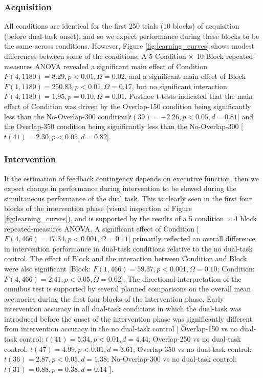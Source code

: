 \documentclass[apacite,draftfirst,jou]{apa6}
\begin{document}
\subsubsection*{Acquisition}
All conditions are identical for the first 250 trials (10 blocks) of acquisition
(before dual-task onset), and so we expect performance during these blocks to be
the same across conditions. However, Figure \ref{fig:learning_curves} shows
modest differences between some of the conditions. A 5 Condition $\times$ 10
Block repeated-measures ANOVA revealed a significant main effect of Condition
$F(4,1180) = 8.29, p < 0.01, \Omega = 0.02$, and a significant main effect of
Block $F(1,1180) = 250.83, p < 0.01, \Omega = 0.17$, but no significant
interaction $F(4,1180) = 1.95, p = 0.10, \Omega = 0.01$. Posthoc t-tests
indicated that the main effect of Condition was driven by the Overlap-150
condition being significantly less than the No-Overlap-300 condition[$t(39) =
-2.26, p < 0.05, d = 0.81$] and the Overlap-350 condition being significantly
less than the No-Overlap-300 [$t(41) = 2.30, p < 0.05, d = 0.82$].

\subsubsection*{Intervention}
If the estimation of feedback contingency depends on executive function,
then we expect change in performance during intervention to be slowed during the
simultaneous performance of the dual task. This is clearly seen in the first
four blocks of the intervention phase (visual inspection of Figure
\ref{fig:learning_curves}), and is supported by the results of a 5 condition
$\times$ 4 block repeated-measures ANOVA. A significant effect of Condition
[$F(4,466) = 17.34, p < 0.001, \Omega = 0.11$] primarily reflected an overall
difference in intervention performance in dual-task conditions relative to the
no dual-task control. The effect of Block and the interaction between Condition
and Block were also significant [Block: $F(1,466) = 59.37, p < 0.001, \Omega =
0.10$; Condition: $F(4,466) = 2.41, p < 0.05, \Omega = 0.02$]. The directional
interpretation of the omnibus test is supported by several planned comparisons
on the overall mean accuracies during the first four blocks of the intervention
phase. Early intervention accuracy in all dual-task conditions in which
the dual-task was introduced before the onset of the intervention phase was
significantly different from intervention accuracy in the no dual-task control
[
Overlap-150 vs no dual-task control: $t(41) = 5.34, p < 0.01, d = 4.44$;
Overlap-250 vs no dual-task control: $t(47) = 4.99, p < 0.01, d = 3.61$;
Overlap-350 vs no dual-task control: $t(36) = 2.87, p < 0.05, d = 1.38$;
No-Overlap-300 vs no dual-task control: $t(31) = 0.88, p = 0.38, d = 0.14$ 
].
\end{document}
